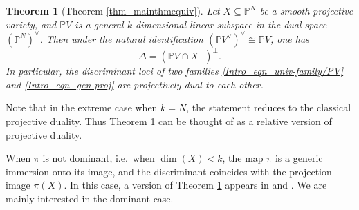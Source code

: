 \documentclass[12pt]{amsart}
\newtheorem{theorem}{Theorem}[section]
\begin{document}

\begin{theorem}[Theorem \ref{thm_mainthmequiv}]\label{thm_dual}
Let $X\subseteq \mathbb P^N$ be a smooth projective variety, and $\mathbb PV$ is a general $k$-dimensional linear subspace in the dual space $(\mathbb P^N)^{\vee}$. %
Then under the natural identification $(\mathbb PV^{\vee})^{\vee}\cong \mathbb PV$, one has
$$\Delta= (\mathbb PV\cap X^{\perp})^{\perp}.$$
In particular, the discriminant loci of two families \eqref{Intro_eqn_univ-family/PV} and \eqref{Intro_eqn_gen-proj} are projectively dual to each other.
\end{theorem}



Note that in the extreme case when $k=N$, the statement reduces to the classical projective duality. Thus Theorem \ref{thm_dual} can be thought of as a relative version of projective duality.


When $\pi$ is not dominant, i.e.\ when $\dim(X)<k$, the map $\pi$ is a generic immersion onto its image,
and the discriminant coincides with the projection image $\pi(X)$.
In this case, a version of Theorem \ref{thm_dual} appears in
\cite[Theorem 1.21]{Tev05} and \cite[Proposition 6.1]{Hol88}. We are mainly interested in the dominant case.
\end{document}

